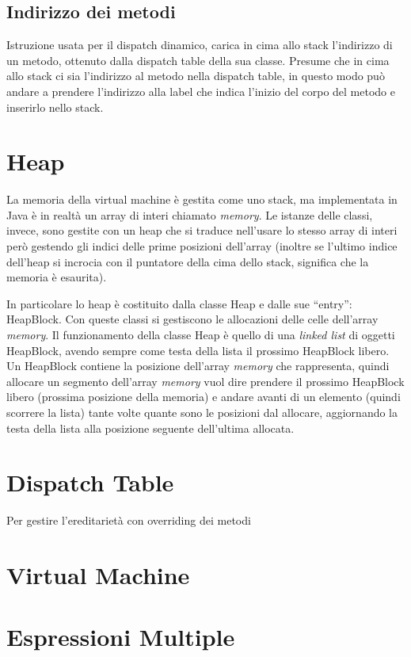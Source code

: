 \documentclass{scrreprt}
\begin{document}
\subsection{Indirizzo dei metodi}
Istruzione usata per il dispatch dinamico, carica in cima allo stack l'indirizzo di un metodo, ottenuto dalla
dispatch table della sua classe. Presume che in cima allo stack ci sia l'indirizzo al metodo nella dispatch table, in questo modo può andare a prendere l'indirizzo
alla label che indica l'inizio del corpo del metodo e inserirlo nello stack.


\section{Heap}
La memoria della virtual machine è gestita come uno stack, ma implementata in Java è in realtà un array di interi chiamato \textit{memory}. 
Le istanze delle classi, invece, sono gestite con un heap che si traduce nell'usare lo stesso array di interi però gestendo
gli indici delle prime posizioni dell'array (inoltre se l'ultimo indice dell'heap si incrocia con il puntatore della cima dello stack, significa che la memoria è esaurita).

In particolare lo heap è costituito dalla classe Heap e dalle sue ``entry'': HeapBlock. 
Con queste classi si gestiscono le allocazioni delle celle dell'array \textit{memory}. Il funzionamento
della classe Heap è quello di una \textit{linked list} di oggetti HeapBlock, avendo sempre come testa della lista il prossimo HeapBlock libero.
Un HeapBlock contiene la posizione dell'array \textit{memory} che rappresenta, quindi allocare un segmento dell'array \textit{memory} vuol dire
prendere il prossimo HeapBlock libero (prossima posizione della memoria) e andare avanti di un elemento (quindi scorrere la lista) tante volte quante sono le posizioni dal allocare, 
aggiornando la testa della lista alla posizione seguente dell'ultima allocata.

\section{Dispatch Table}

Per gestire l'ereditarietà con overriding dei metodi

\section{Virtual Machine}

\section{Espressioni Multiple}
\end{document}
